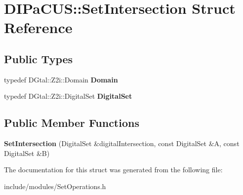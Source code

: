 \hypertarget{structDIPaCUS_1_1SetIntersection}{}\section{D\+I\+Pa\+C\+US\+:\+:Set\+Intersection Struct Reference}
\label{structDIPaCUS_1_1SetIntersection}
\subsection*{Public Types}
\begin{DoxyCompactItemize}
\item 
\mbox{\label{structDIPaCUS_1_1SetIntersection_a281215e29cad4c063af9e94d5ab251e7}} 
typedef D\+Gtal\+::\+Z2i\+::\+Domain {\bfseries Domain}
\item 
\mbox{\label{structDIPaCUS_1_1SetIntersection_a9800cb8f399c79509b08b5af55f4d021}} 
typedef D\+Gtal\+::\+Z2i\+::\+Digital\+Set {\bfseries Digital\+Set}
\end{DoxyCompactItemize}
\subsection*{Public Member Functions}
\begin{DoxyCompactItemize}
\item 
\mbox{\label{structDIPaCUS_1_1SetIntersection_ac6583c062d7bb26a13643a869c7f6fd3}} 
{\bfseries Set\+Intersection} (Digital\+Set \&digital\+Intersection, const Digital\+Set \&A, const Digital\+Set \&B)
\end{DoxyCompactItemize}


The documentation for this struct was generated from the following file\+:\begin{DoxyCompactItemize}
\item 
include/modules/Set\+Operations.\+h\end{DoxyCompactItemize}
